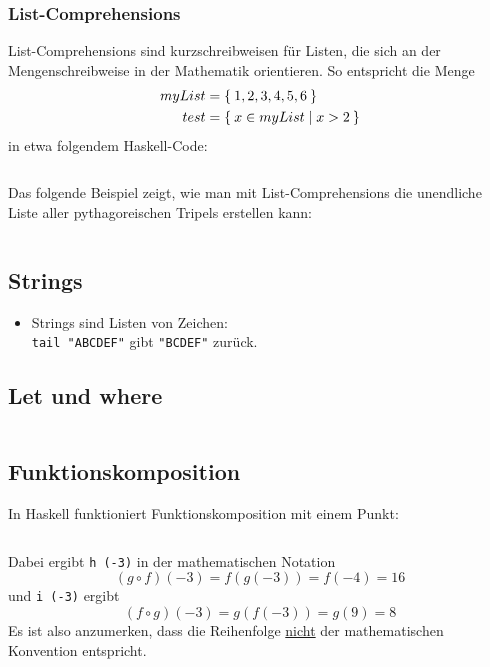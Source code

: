 \subsubsection{List-Comprehensions}%
List-Comprehensions sind kurzschreibweisen für Listen, die sich an 
der Mengenschreibweise in der Mathematik orientieren. So entspricht
die Menge
\begin{align*}
    myList &= \Set{1,2,3,4,5,6}\\
    test   &= \Set{x \in myList | x > 2}
\end{align*}
in etwa folgendem Haskell-Code:
\inputminted[numbersep=5pt, tabsize=4]{haskell}{scripts/haskell/list-comprehensions.sh}

\begin{beispiel}
    Das folgende Beispiel zeigt, wie man mit List-Comprehensions die unendliche
    Liste aller pythagoreischen Tripels erstellen kann:

    \inputminted[numbersep=5pt, tabsize=4]{haskell}{scripts/haskell/pythagorean-triples.hs}
\end{beispiel}

\subsection{Strings}
\begin{itemize}
    \item Strings sind Listen von Zeichen:\\
          \texttt{tail "ABCDEF"} gibt \texttt{"BCDEF"} zurück.
\end{itemize}

\subsection{Let und where}%
\inputminted[numbersep=5pt, tabsize=4]{haskell}{scripts/haskell/let-where-bindung.hs}

\subsection{Funktionskomposition}%
In Haskell funktioniert Funktionskomposition mit einem Punkt:

\inputminted[numbersep=5pt, tabsize=4]{haskell}{scripts/haskell/function-composition.hs}

Dabei ergibt \texttt{h (-3)} in der mathematischen Notation
\[(g \circ f) (-3) = f(g(-3)) = f(-4) = 16\]
und \texttt{i (-3)} ergibt
\[(f \circ g) (-3) = g(f(-3)) = g(9) = 8\]
Es ist also anzumerken, dass die Reihenfolge \underline{nicht} der mathematischen
Konvention entspricht.


